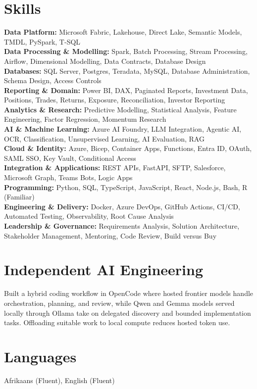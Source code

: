 \documentclass[10pt,a4paper]{article}
\begin{document}
\section*{Skills}
\textbf{Data Platform:} Microsoft Fabric, Lakehouse, Direct Lake, Semantic Models, TMDL, PySpark, T-SQL \\
\textbf{Data Processing \& Modelling:} Spark, Batch Processing, Stream Processing, Airflow, Dimensional
Modelling, Data Contracts, Database Design \\
\textbf{Databases:} SQL Server, Postgres, Teradata, MySQL, Database Administration, Schema Design, Access
Controls \\
\textbf{Reporting \& Domain:} Power BI, DAX, Paginated Reports, Investment Data, Positions, Trades,
Returns, Exposure, Reconciliation, Investor Reporting \\
\textbf{Analytics \& Research:} Predictive Modelling, Statistical Analysis, Feature Engineering, Factor
Regression, Momentum Research \\
\textbf{AI \& Machine Learning:} Azure AI Foundry, LLM Integration, Agentic AI, OCR, Classification,
Unsupervised Learning, AI Evaluation, RAG \\
\textbf{Cloud \& Identity:} Azure, Bicep, Container Apps, Functions, Entra ID, OAuth, SAML SSO, Key Vault,
Conditional Access \\
\textbf{Integration \& Applications:} REST APIs, FastAPI, SFTP, Salesforce, Microsoft Graph, Teams Bots,
Logic Apps \\
\textbf{Programming:} Python, SQL, TypeScript, JavaScript, React, Node.js, Bash, R (Familiar) \\
\textbf{Engineering \& Delivery:} Docker, Azure DevOps, GitHub Actions, CI/CD, Automated Testing,
Observability, Root Cause Analysis \\
\textbf{Leadership \& Governance:} Requirements Analysis, Solution Architecture, Stakeholder Management,
Mentoring, Code Review, Build versus Buy

\section*{Independent AI Engineering}
Built a hybrid coding workflow in OpenCode where hosted frontier models handle orchestration, planning, and
review, while Qwen and Gemma models served locally through Ollama take on delegated discovery and bounded
implementation tasks. Offloading suitable work to local compute reduces hosted token use.

\section*{Languages}
Afrikaans (Fluent), English (Fluent)
\end{document}
